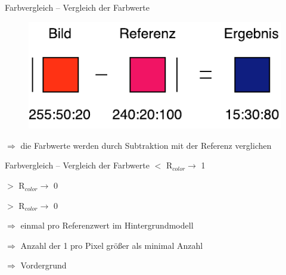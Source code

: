 \documentclass[hyperref={pdfpagelabels=false}]{beamer}
\begin{document}
\begin{frame}[t]{Farbvergleich -- Vergleich der Farbwerte}
	\bigskip
	\bigskip
	\bigskip

	\begin{figure}
		\centering
		\includegraphics[width=0.6\linewidth]{Abbildungen/Farb_Vergleich.pdf}
		\label{fig:Abbildungen/Grid}
	\end{figure}
	\centering
	\bigskip
	$\Rightarrow$ die Farbwerte werden durch Subtraktion mit der Referenz verglichen
\end{frame}

\begin{frame}[t]{Farbvergleich -- Vergleich der Farbwerte}
	\centering
	\bigskip
	\bigskip
	 $<$ R$_{color} \rightarrow$ 1

	 $>$ R$_{color} \rightarrow$ 0
	
	 $>$ R$_{color} \rightarrow$ 0

	\bigskip
	\bigskip
	$\Rightarrow$ einmal pro Referenzwert im Hintergrundmodell
	\bigskip
	
	$\Rightarrow$ Anzahl der 1 pro Pixel größer als minimal Anzahl
	\bigskip
	
	$\Rightarrow$ Vordergrund
\end{frame}
\end{document}
